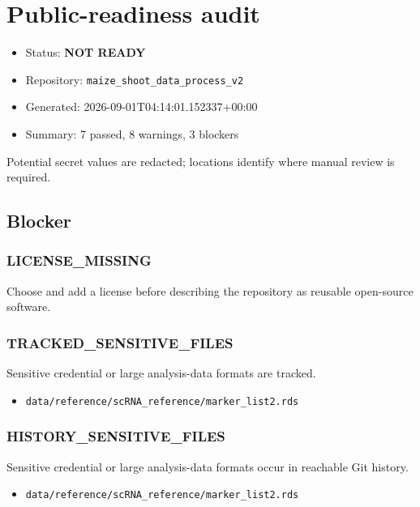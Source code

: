\documentclass[
]{article}
\author{}
\date{\vspace{-2.5em}}
\providecommand{\tightlist}{%
  \setlength{\itemsep}{0pt}\setlength{\parskip}{0pt}}
\begin{document}
\section{Public-readiness audit}\label{public-readiness-audit}

\begin{itemize}
\tightlist
\item
  Status: \textbf{NOT READY}
\item
  Repository: \texttt{maize\_shoot\_data\_process\_v2}
\item
  Generated: 2026-09-01T04:14:01.152337+00:00
\item
  Summary: 7 passed, 8 warnings, 3 blockers
\end{itemize}

Potential secret values are redacted; locations identify where manual
review is required.

\subsection{Blocker}\label{blocker}

\subsubsection{LICENSE\_MISSING}\label{license_missing}

Choose and add a license before describing the repository as reusable
open-source software.

\subsubsection{TRACKED\_SENSITIVE\_FILES}\label{tracked_sensitive_files}

Sensitive credential or large analysis-data formats are tracked.

\begin{itemize}
\tightlist
\item
  \texttt{data/reference/scRNA\_reference/marker\_list2.rds}
\end{itemize}

\subsubsection{HISTORY\_SENSITIVE\_FILES}\label{history_sensitive_files}

Sensitive credential or large analysis-data formats occur in reachable
Git history.

\begin{itemize}
\tightlist
\item
  \texttt{data/reference/scRNA\_reference/marker\_list2.rds}
\end{itemize}
\end{document}
